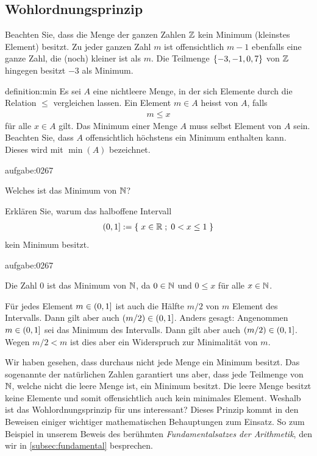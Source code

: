 \subsection{Wohlordnungsprinzip}
Beachten Sie, dass die Menge der ganzen Zahlen $\mathbb{Z}$ kein Minimum (kleinstes Element) besitzt. Zu jeder ganzen Zahl $m$ ist offensichtlich $m-1$ ebenfalls eine ganze Zahl, die (noch) kleiner ist als $m$. Die Teilmenge $\left\{-3,-1,0,7\right\}$ von $\mathbb{Z}$ hingegen besitzt $-3$ als Minimum.
\begin{definition}[ Minimum]{definition:min}
Es sei $A$ eine nichtleere Menge, in der sich Elemente durch die Relation $\leq$ vergleichen lassen. Ein Element $m\in A$ heisst  von $A$, falls
\begin{align*}
    m \leq x
\end{align*}
für alle $x\in A$ gilt. Das Minimum einer Menge $A$ muss selbst Element von $A$ sein. Beachten Sie, dass $A$ offensichtlich höchstens ein Minimum enthalten kann. Dieses wird mit $\min(A)$ bezeichnet.
\end{definition}

\begin{aufgabe}{aufgabe:0267}
\begin{aenum}
    \item Welches ist das Minimum von $\mathbb{N}$?
    \item Erklären Sie, warum das halboffene Intervall 
    \begin{align*}
        \left(0, 1\right] := \left\{\;x\in\mathbb{R} \; ; \; 0<x\leq 1 \;\right\}
    \end{align*}
    kein Minimum besitzt.
\end{aenum}
\end{aufgabe}
\begin{antwort}{aufgabe:0267}
    \begin{aenum}
        \item Die Zahl $0$ ist das Minimum von $\mathbb{N}$, da $0\in\mathbb{N}$ und $0\leq x$ für alle $x\in\mathbb{N}$.
        \item Für jedes Element $m\in\left(0, 1\right]$ ist auch die Hälfte $m/2$ von $m$ Element des Intervalls. Dann gilt aber auch $\left(m/2\right)\in\left(0, 1\right]$. Anders gesagt: Angenommen $m\in\left(0, 1\right]$ sei das Minimum des Intervalls. Dann gilt aber auch $\left(m/2\right)\in\left(0, 1\right]$. Wegen $m/2<m$ ist dies aber ein Widerspruch zur Minimalität von $m$.
    \end{aenum}
\end{antwort}
Wir haben gesehen, dass durchaus nicht jede Menge ein Minimum besitzt. Das sogenannte  der natürlichen Zahlen garantiert uns aber, dass jede Teilmenge von $\mathbb{N}$, welche nicht die leere Menge ist, ein Minimum besitzt. Die leere Menge besitzt keine Elemente und somit offensichtlich auch kein minimales Element. Weshalb ist das Wohlordnungsprinzip für uns interessant? Dieses Prinzip kommt in den Beweisen einiger wichtiger mathematischen Behauptungen zum Einsatz. So zum Beispiel in unserem Beweis des berühmten \textit{Fundamentalsatzes der Arithmetik}, den wir in \cref{subsec:fundamental} besprechen.

